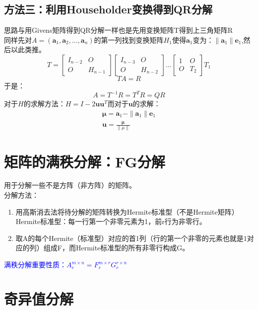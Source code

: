 \documentclass[12pt]{article}
\begin{document}
\begin{CJK*}{UTF8}{gbsn}
\subsection{方法三：利用Householder变换得到QR分解}
思路与用Givens矩阵得到QR分解一样也是先用变换矩阵T得到上三角矩阵R\\
同样先对$A=(\bm a_1,\bm a_2,...,\bm a_n)$的第一列找到变换矩阵$H_1$使得$\bm a_1$变为：$\|\bm a_1\|\bm e_1$,然后以此类推。
\begin{equation}
	T=
	\begin{bmatrix}
	I_{n-2}& O \\
	O& H_{n-1} 
\end{bmatrix}\begin{bmatrix}
	I_{n-3}& O \\
	O& H_{n-2} 
\end{bmatrix}...\begin{bmatrix}
	1 &O \\
	O& T_2 
\end{bmatrix}T_1
\end{equation}
\begin{equation}
	TA=R
\end{equation}
于是：
\begin{equation}
	A=T^{-1}R=T^TR=QR
\end{equation}
对于$H$的求解方法：$H=I-2\bm u\bm u^T$而对于$\bm u$的求解：
\begin{align*}
	\bm \mu= \bm a_1-\|\bm a_1\|\bm e_1\\
	\bm u=\frac{\bm \mu}{\|\mu\|}
\end{align*}
\pagebreak
\section{矩阵的满秩分解：FG分解}
用于分解一些不是方阵（非方阵）的矩阵。\\
分解方法：
\begin{enumerate}
	\item 用高斯消去法将待分解的矩阵转换为Hermite标准型（不是Hermite矩阵）\\
	Hermite标准型：每一行第一个非零元素为1，前r行为非零行。
	\item 取A的每个Hermite（标准型）对应的首1列（行的第一个非零的元素也就是1对应的列）组成F，而Hermite标准型的所有非零行构成G。
\end{enumerate}
\textcolor{blue}{满秩分解重要性质：$A_r^{m\times n}=F_r^{m\times r}G_r^{r\times n}$}

\section{奇异值分解}

\end{CJK*}
\end{document}
